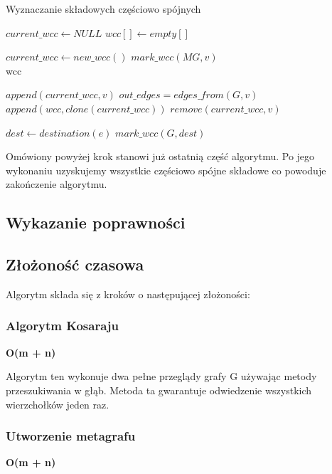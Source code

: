 \documentclass[a4paper,10pt]{article}
\begin{document}
\begin{algorithm}
\caption{Wyznaczanie składowych częściowo spójnych}
\begin{algorithmic}
\State $current\_wcc \leftarrow NULL $
\State $wcc[] \leftarrow empty[] $

    \State $current\_wcc \leftarrow new\_wcc() $
    \State $mark\_wcc(MG, v)$
  \EndIf
\EndFor\\
\Return wcc
\EndFunction

  \State $append(current\_wcc, v)$
  \State $out\_edges = edges\_from(G, v)$
    \State $append(wcc, clone(current\_wcc))$
    \State $remove(current\_wcc, v)$

    \Return
  \EndIf

    \State $dest \leftarrow destination(e)$
    \State $mark\_wcc(G, dest)$
  \EndFor

\EndFunction
\end{algorithmic}
\end{algorithm}


Omówiony powyżej krok stanowi już ostatnią część algorytmu. Po jego
wykonaniu uzyskujemy wszystkie częściowo spójne składowe co powoduje
zakończenie algorytmu.

\subsection{Wykazanie poprawności}
\subsection{Złożoność czasowa}
Algorytm składa się z kroków o następującej złożoności:


\subsubsection{Algorytm Kosaraju}
\begin{center}
{\large\bf O(m + n)}
\end{center}

Algorytm ten wykonuje dwa pełne przeglądy grafy G używając metody
przeszukiwania w głąb. Metoda ta gwarantuje odwiedzenie wszystkich
wierzchołków jeden raz.

\subsubsection{Utworzenie metagrafu}
\begin{center}
{\large\bf O(m + n)}
\end{center}
\end{document}
